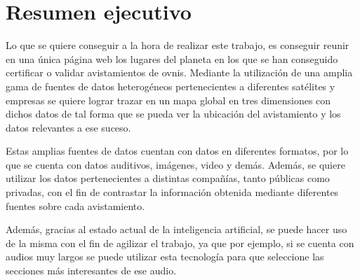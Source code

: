 \section{Resumen ejecutivo}

Lo que se quiere conseguir a la hora de realizar este trabajo, es conseguir reunir en una única página web los lugares del planeta 
en los que se han conseguido certificar o validar avistamientos de ovnis. 
Mediante la utilización de una amplia gama de fuentes de datos heterogéneos pertenecientes a diferentes satélites y empresas se quiere lograr trazar en un mapa global en tres dimensiones con dichos datos de tal forma que se pueda ver la ubicación del avistamiento y los datos relevantes a ese suceso.

Estas amplias fuentes de datos cuentan con datos en diferentes formatos, por lo que se cuenta con datos auditivos, imágenes, video y demás. 
Además, se quiere utilizar los datos pertenecientes a distintas compañías, tanto públicas como privadas, 
con el fin de contrastar la información obtenida mediante diferentes fuentes sobre cada avistamiento.

Además, gracias al estado actual de la inteligencia artificial, se puede hacer uso de la misma con el fin de agilizar el trabajo, ya que por ejemplo, 
si se cuenta con audios muy largos se puede utilizar esta tecnología para que seleccione las secciones más interesantes de ese audio.
